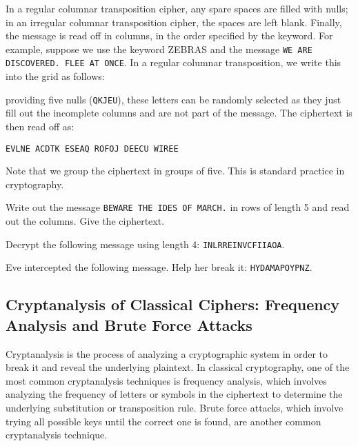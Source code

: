 \documentclass[11pt,a4paper]{report}
\begin{document}
In a regular columnar transposition cipher, any spare spaces are filled with nulls; in an irregular columnar transposition cipher, the spaces are left blank. Finally, the message is read off in columns, in the order specified by the keyword. For example, suppose we use the keyword ZEBRAS and the message \verb|WE ARE DISCOVERED. FLEE AT ONCE|. In a regular columnar transposition, we write this into the grid as follows:

providing five nulls (\verb|QKJEU|), these letters can be randomly selected as they just fill out the incomplete columns and are not part of the message. The ciphertext is then read off as:

\verb|EVLNE ACDTK ESEAQ ROFOJ DEECU WIREE|

Note that  we group the ciphertext in groups of five. This is standard practice in cryptography.


\begin{ex}
Write out the message
\verb|BEWARE THE IDES OF MARCH.|
in rows of length 5 and read out the columns. Give the ciphertext.
\end{ex}

\begin{ex}
Decrypt the following message using length 4: \verb|INLRREINVCFIIAOA|.
\end{ex}

\begin{ex}
Eve intercepted the following message. Help her break it: \verb|HYDAMAPOYPNZ|.
\end{ex}




\subsection{Cryptanalysis of Classical Ciphers: Frequency Analysis and Brute Force Attacks}

Cryptanalysis is the process of analyzing a cryptographic system in order to break it and reveal the underlying plaintext. In classical cryptography, one of the most common cryptanalysis techniques is frequency analysis, which involves analyzing the frequency of letters or symbols in the ciphertext to determine the underlying substitution or transposition rule. Brute force attacks, which involve trying all possible keys until the correct one is found, are another common cryptanalysis technique.
\end{document}
